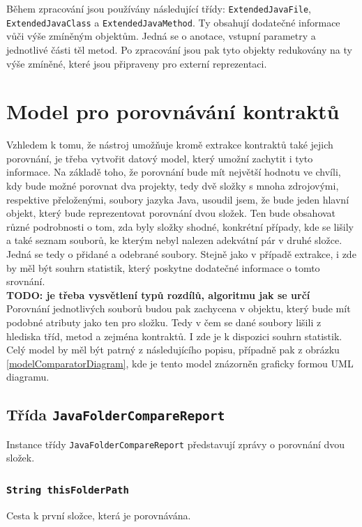 	
		Během zpracování jsou používány následující třídy: \texttt{ExtendedJavaFile}, \texttt{ExtendedJavaClass} a \texttt{ExtendedJavaMethod}. Ty obsahují dodatečné informace vůči výše zmíněným objektům. Jedná se o anotace, vstupní parametry a jednotlivé části těl metod. Po zpracování jsou pak tyto objekty redukovány na ty výše zmíněné, které jsou připraveny pro externí reprezentaci.
		

	\section{Model pro porovnávání kontraktů}
		Vzhledem k tomu, že nástroj umožňuje kromě extrakce kontraktů také jejich porovnání, je třeba vytvořit datový model, který umožní zachytit i tyto informace. Na základě toho, že porovnání bude mít největší hodnotu ve chvíli, kdy bude možné porovnat dva projekty, tedy dvě složky s mnoha zdrojovými, respektive přeloženými, soubory jazyka Java, usoudil jsem, že bude jeden hlavní objekt, který bude reprezentovat porovnání dvou složek. Ten bude obsahovat různé podrobnosti o tom, zda byly složky shodné, konkrétní případy, kde se lišily a také seznam souborů, ke kterým nebyl nalezen adekvátní pár v druhé složce. Jedná se tedy o přidané a odebrané soubory. Stejně jako v případě extrakce, i zde by měl být souhrn statistik, který poskytne dodatečné informace o tomto srovnání.\\
		
		\textbf{\textcolor{pblue}{TODO: je třeba vysvětlení typů rozdílů, algoritmu jak se určí}}\\		
		
		Porovnání jednotlivých souborů budou pak zachycena v objektu, který bude mít podobné atributy jako ten pro složku. Tedy v čem se dané soubory lišili z hlediska tříd, metod a zejména kontraktů. I zde je k dispozici souhrn statistik. Celý model by měl být patrný z následujícího popisu, případně pak z obrázku \ref{modelComparatorDiagram}, kde je tento model znázorněn graficky formou UML diagramu.
		
		\subsection{Třída \texttt{JavaFolderCompareReport}}
			Instance třídy \texttt{JavaFolderCompareReport} představují zprávy o porovnání dvou složek.
			
			\subsubsection{\texttt{String thisFolderPath}}
				Cesta k první složce, která je porovnávána.
				
